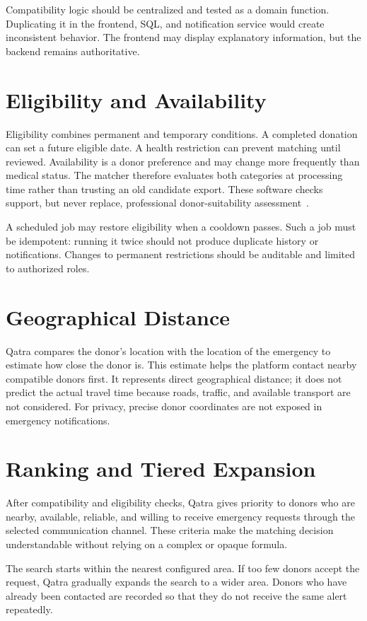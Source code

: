 Compatibility logic should be centralized and tested as a domain function. Duplicating it in the frontend, SQL, and notification service would create inconsistent behavior. The frontend may display explanatory information, but the backend remains authoritative.

\section{Eligibility and Availability}
Eligibility combines permanent and temporary conditions. A completed donation can set a future eligible date. A health restriction can prevent matching until reviewed. Availability is a donor preference and may change more frequently than medical status. The matcher therefore evaluates both categories at processing time rather than trusting an old candidate export. These software checks support, but never replace, professional donor-suitability assessment~\cite{whoDonorSelection}.

A scheduled job may restore eligibility when a cooldown passes. Such a job must be idempotent: running it twice should not produce duplicate history or notifications. Changes to permanent restrictions should be auditable and limited to authorized roles.

\section{Geographical Distance}
Qatra compares the donor's location with the location of the emergency to estimate how close the donor is. This estimate helps the platform contact nearby compatible donors first. It represents direct geographical distance; it does not predict the actual travel time because roads, traffic, and available transport are not considered. For privacy, precise donor coordinates are not exposed in emergency notifications.

\section{Ranking and Tiered Expansion}
After compatibility and eligibility checks, Qatra gives priority to donors who are nearby, available, reliable, and willing to receive emergency requests through the selected communication channel. These criteria make the matching decision understandable without relying on a complex or opaque formula.

The search starts within the nearest configured area. If too few donors accept the request, Qatra gradually expands the search to a wider area. Donors who have already been contacted are recorded so that they do not receive the same alert repeatedly.


